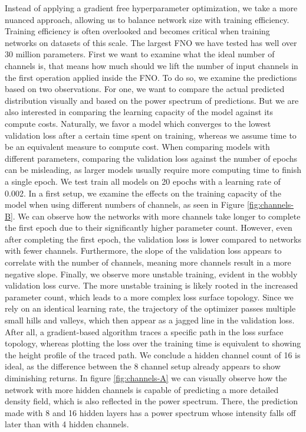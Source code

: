 \documentclass{article}
\begin{document}
Instead of applying a gradient free hyperparameter optimization, we take a more nuanced approach, allowing us to balance network size with training efficiency. Training efficiency is often overlooked and becomes critical when training networks on datasets of this scale. The largest FNO we have tested has well over 30 million parameters. First we want to examine what the ideal number of channels is, that means how much should we lift the number of input channels in the first operation applied inside the FNO. To do so, we examine the predictions based on two observations. For one, we want to compare the actual predicted distribution visually and based on the power spectrum of predictions. But we are also interested in comparing the learning capacity of the model against its compute costs. Naturally, we favor a model which converges to the lowest validation loss after a certain time spent on training, whereas we assume time to be an equivalent measure to compute cost. When comparing models with different parameters, comparing the validation loss against the number of epochs can be misleading, as larger models usually require more computing time to finish a single epoch. We test train all models on 20 epochs with a learning rate of 0.002. In a first setup, we examine the effects on the training capacity of the model when using different numbers of channels, as seen in Figure \ref{fig:channels-B}. We can observe how the networks with more channels take longer to complete the first epoch due to their significantly higher parameter count. However, even after completing the first epoch, the validation loss is lower compared to networks with fewer channels. Furthermore, the slope of the validation loss appears to correlate with the number of channels, meaning more channels result in a more negative slope. Finally, we observe more unstable training, evident in the wobbly validation loss curve. The more unstable training is likely rooted in the increased parameter count, which leads to a more complex loss surface topology. Since we rely on an identical learning rate, the trajectory of the optimizer passes multiple small hills and valleys, which then appear as a jagged line in the validation loss. After all, a gradient-based algorithm traces a specific path in the loss surface topology, whereas plotting the loss over the training time is equivalent to showing the height profile of the traced path. We conclude a hidden channel count of 16 is ideal, as the difference between the 8 channel setup already appears to show diminishing returns. In figure \ref{fig:channels-A} we can visually observe how the network with more hidden channels is capable of predicting a more detailed density field, which is also reflected in the power spectrum. There, the prediction made with 8 and 16 hidden layers has a power spectrum whose intensity falls off later than with 4 hidden channels.
\end{document}
